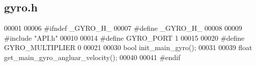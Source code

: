 \subsection{gyro.\+h}
\label{gyro_8h_source}

\begin{DoxyCode}
00001 
00006 \textcolor{preprocessor}{#ifndef \_GYRO\_H\_}
00007 \textcolor{preprocessor}{#define \_GYRO\_H\_}
00008 
00009 \textcolor{preprocessor}{#include "API.h"}
00010 
00014 \textcolor{preprocessor}{#define GYRO\_PORT 1}
00015 
00020 \textcolor{preprocessor}{#define GYRO\_MULTIPLIER 0}
00021 
00030 \textcolor{keywordtype}{bool} init_main_gyro();
00031 
00039 \textcolor{keywordtype}{float} get_main_gyro_angluar_velocity();
00040 
00041 \textcolor{preprocessor}{#endif}
\end{DoxyCode}
